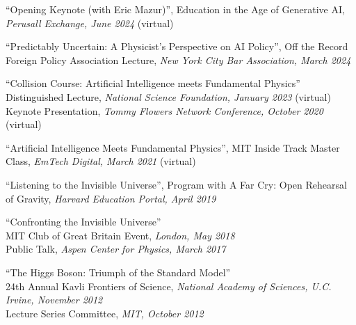 \bbl

\item ``Opening Keynote (with Eric Mazur)'', Education in the Age of Generative AI, \emph{Perusall Exchange, June 2024} (virtual)

\item ``Predictably Uncertain: A Physicist’s Perspective on AI Policy'', Off the Record Foreign Policy Association Lecture, \emph{New York City Bar Association, March 2024}

\item ``Collision Course: Artificial Intelligence meets Fundamental Physics''
\\ Distinguished Lecture, \emph{National Science Foundation, January 2023} (virtual)
\\ Keynote Presentation, \emph{Tommy Flowers Network Conference, October 2020} (virtual)

\item ``Artificial Intelligence Meets Fundamental Physics'', MIT Inside Track Master Class, \emph{EmTech Digital, March 2021} (virtual)

\item ``Listening to the Invisible Universe'', Program with A Far Cry: Open Rehearsal of Gravity, \emph{Harvard Education Portal, April 2019}

\item ``Confronting the Invisible Universe''
\\ MIT Club of Great Britain Event, \emph{London, May 2018}
\\ Public Talk, \emph{Aspen Center for Physics, March 2017}

\item ``The Higgs Boson:  Triumph of the Standard Model''
\\ 24th Annual Kavli Frontiers of Science, \emph{National Academy of Sciences, U.C. Irvine, November 2012}
\\ Lecture Series Committee, \emph{MIT, October 2012}

\el
